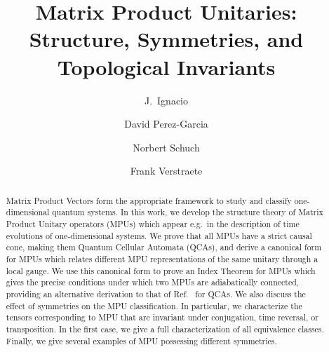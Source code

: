 \documentclass[pra,twocolumn,nofootinbib,superscriptaddress]{revtex4-1}
\begin{document}
\title{Matrix Product Unitaries: Structure, Symmetries, and Topological Invariants}


\author{J.~Ignacio }

\author{David Perez-Garcia}

\author{Norbert Schuch}

\author{Frank Verstraete}









\begin{abstract}
	Matrix Product Vectors form the appropriate framework to study and
	classify one-dimensional quantum systems.  In this work, we develop the
	structure theory of Matrix Product Unitary operators (MPUs) which appear
	e.g.\ in the description of time evolutions of one-dimensional systems. We
	prove that all MPUs have a strict causal cone, making them Quantum
	Cellular Automata (QCAs), and derive a canonical form for MPUs which
	relates different MPU representations of the same unitary through a local
	gauge. We use this canonical form to prove an Index Theorem for MPUs which
	gives the precise conditions under which two MPUs are adiabatically
	connected, providing an alternative derivation to that of
	Ref.~\cite{gross:index-theorem} for QCAs.  We also discuss the effect of
	symmetries on the MPU classification. In particular, we characterize the
	tensors corresponding to MPU that are invariant under conjugation,
	time reversal, or transposition. In the first case, we give a full
	characterization of all equivalence classes. Finally, we give several
	examples of MPU possessing different symmetries.
\end{abstract}


\maketitle
\end{document}
